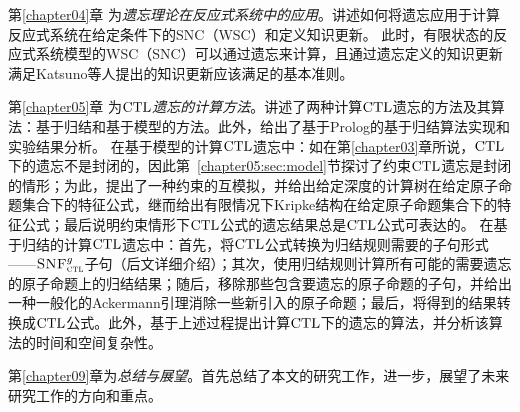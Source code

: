 第\ref{chapter04}章 为{\em 遗忘理论在反应式系统中的应用}。讲述如何将遗忘应用于计算反应式系统在给定条件下的SNC（WSC）和定义知识更新。
此时，有限状态的反应式系统模型的WSC（SNC）可以通过遗忘来计算，且通过遗忘定义的知识更新满足Katsuno等人提出的知识更新应该满足的基本准则。


第\ref{chapter05}章 为{\em $\textrm{CTL}$遗忘的计算方法}。讲述了两种计算$\textrm{CTL}$遗忘的方法及其算法：基于归结和基于模型的方法。此外，给出了基于Prolog的基于归结算法实现和实验结果分析。
在基于模型的计算$\textrm{CTL}$遗忘中：如在第\ref{chapter03}章所说，$\textrm{CTL}$下的遗忘不是封闭的，因此第~\ref{chapter05:sec:model}节探讨了约束$\textrm{CTL}$遗忘是封闭的情形；为此，提出了一种约束的互模拟，并给出给定深度的计算树在给定原子命题集合下的特征公式，继而给出有限情况下Kripke结构在给定原子命题集合下的特征公式；最后说明约束情形下$\textrm{CTL}$公式的遗忘结果总是$\textrm{CTL}$公式可表达的。
在基于归结的计算$\textrm{CTL}$遗忘中：首先，将$\textrm{CTL}$公式转换为归结规则需要的子句形式——${\textsc{SNF}_{\textsc{ctl}}^g}$子句（后文详细介绍）；其次，使用归结规则计算所有可能的需要遗忘的原子命题上的归结结果；随后，移除那些包含要遗忘的原子命题的子句，并给出一种一般化的Ackermann引理消除一些新引入的原子命题；最后，将得到的结果转换成$\textrm{CTL}$公式。此外，基于上述过程提出计算$\textrm{CTL}$下的遗忘的算法，并分析该算法的时间和空间复杂性。













第\ref{chapter09}章为\textit{总结与展望}。首先总结了本文的研究工作，进一步，展望了未来研究工作的方向和重点。
